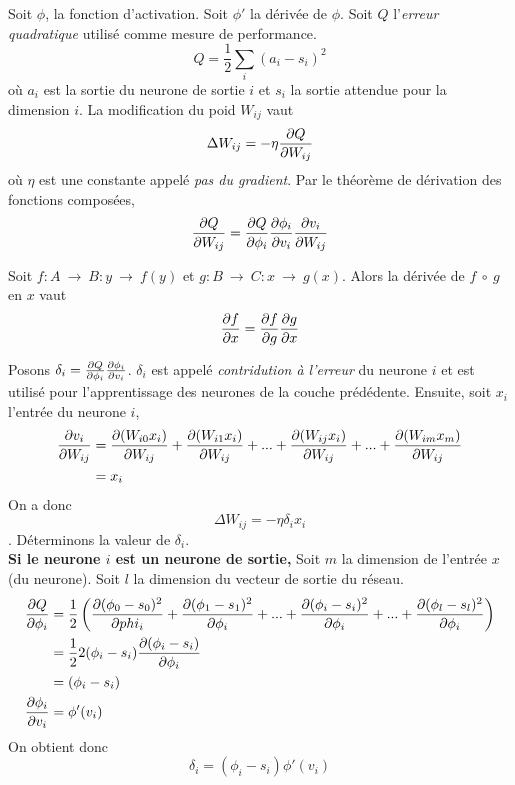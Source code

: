 \documentclass[12pt,a4paper,oneside, titlepage]{article}
\begin{document}
Soit $\phi$, la fonction d'activation. Soit $\phi'$ la dérivée de $\phi$. Soit $Q$ l'\emph{erreur quadratique} utilisé comme mesure de performance.
\[Q = \frac{1}{2}\sum_{i}(a_i-s_i)^2\] où $a_i$ est la sortie du neurone de sortie $i$ et $s_i$ la sortie attendue pour la dimension $i$.
La modification du poid $W_{ij}$ vaut \[\Delta W_{ij} = -\eta\frac{\partial Q}{\partial W_{ij}}\] où $\eta$ est une constante appelé \emph{pas du gradient}.
Par le théorème de dérivation des fonctions composées, \[\frac{\partial Q}{\partial W_{ij}} = \frac{\partial Q}{\partial \phi_i} \frac{\partial \phi_i}{\partial v_i} \frac{\partial v_i}{\partial W_{ij}}\]
\begin{thm}
Soit $f:A~\rightarrow~B : y~\rightarrow~f(y)$ et $g:B~\rightarrow~C : x~\rightarrow~g(x)$. Alors la dérivée de $f~\circ~g$ en $x$ vaut
\[\frac{\partial f}{\partial x} = \frac{\partial f}{\partial g} \frac{\partial g}{\partial x}\]
\end{thm}
Posons $\delta_i = \frac{\partial Q}{\partial \phi_i} \frac{\partial \phi_i}{\partial v_i}$. $\delta_i$ est appelé \emph{contridution à l'erreur} du neurone $i$ et est utilisé pour l'apprentissage des neurones de la couche prédédente.
Ensuite, soit $x_i$ l'entrée du neurone $i$,
\begin{equation}
 \begin{split}
  \frac{\partial v_i}{\partial W_{ij}} & = \frac{\partial (W_{i0}x_i)}{\partial W_{ij}} + \frac{\partial (W_{i1}x_i)}{\partial W_{ij}} + ... + \frac{\partial (W_{ij}x_i)}{\partial W_{ij}} + ... + \frac{\partial (W_{im}x_m)}{\partial W_{ij}}\\
  ~ & = x_i
  \end{split}
\end{equation}
On a donc \[\Delta W_{ij} = -\eta \delta_i x_i\].
Déterminons la valeur de $\delta_i$.\\

\textbf{Si le neurone $i$ est un neurone de sortie,}
Soit $m$ la dimension de l'entrée $x$ (du neurone). Soit $l$ la dimension du vecteur de sortie du réseau.
\begin{equation}
 \begin{split}
  \frac{\partial Q}{\partial \phi_i} & = \frac{1}{2} \left( \frac{\partial (\phi_0 - s_0)^2}{\partial phi_i} + \frac{\partial (\phi_1 - s_1)^2}{\partial \phi_i} + ... + \frac{\partial (\phi_i - s_i)^2}{\partial \phi_i} + ... + \frac{\partial (\phi_l - s_l)^2}{\partial \phi_i} \right)\\
  ~ & = \frac{1}{2}2(\phi_i - s_i)\frac{\partial (\phi_i - s_i)}{\partial \phi_i}\\
  ~ & = (\phi_i - s_i)\\
  \frac{\partial \phi_i}{\partial v_i} & = \phi'(v_i)
 \end{split}
\end{equation}
On obtient donc \[\delta_i = (\phi_i - s_i)\phi'(v_i)\]
\end{document}
